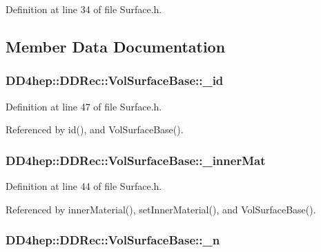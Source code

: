 Definition at line 34 of file Surface.h.

\subsection{Member Data Documentation}
\hypertarget{class_d_d4hep_1_1_d_d_rec_1_1_vol_surface_base_ab8b2a71397c0d4c0be2683aabb4e7882}{
\subsubsection[{\_\-id}]{ {\bf DD4hep::DDRec::VolSurfaceBase::\_\-id}}}
\label{class_d_d4hep_1_1_d_d_rec_1_1_vol_surface_base_ab8b2a71397c0d4c0be2683aabb4e7882}


Definition at line 47 of file Surface.h.

Referenced by id(), and VolSurfaceBase().\hypertarget{class_d_d4hep_1_1_d_d_rec_1_1_vol_surface_base_abfa00728ddc6fc977fb9d297038448c2}{
\subsubsection[{\_\-innerMat}]{ {\bf DD4hep::DDRec::VolSurfaceBase::\_\-innerMat}}}
\label{class_d_d4hep_1_1_d_d_rec_1_1_vol_surface_base_abfa00728ddc6fc977fb9d297038448c2}


Definition at line 44 of file Surface.h.

Referenced by innerMaterial(), setInnerMaterial(), and VolSurfaceBase().\hypertarget{class_d_d4hep_1_1_d_d_rec_1_1_vol_surface_base_a9371dc34ec00ff652bc4e0ae1423364c}{
\subsubsection[{\_\-n}]{ {\bf DD4hep::DDRec::VolSurfaceBase::\_\-n}}}
\label{class_d_d4hep_1_1_d_d_rec_1_1_vol_surface_base_a9371dc34ec00ff652bc4e0ae1423364c}


